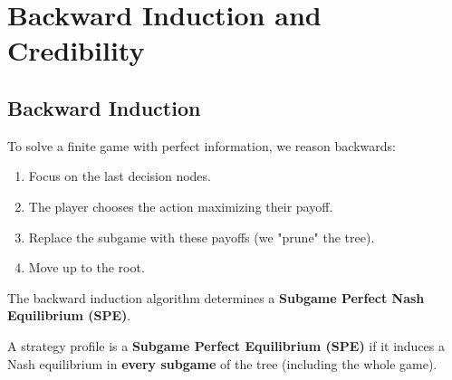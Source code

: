 \section{Backward Induction and Credibility}

\subsection{Backward Induction}
To solve a finite game with perfect information, we reason backwards:
\begin{enumerate}
    \item Focus on the last decision nodes.
    \item The player chooses the action maximizing their payoff.
    \item Replace the subgame with these payoffs (we "prune" the tree).
    \item Move up to the root.
\end{enumerate}

\begin{theoreme}
The backward induction algorithm determines a \textbf{Subgame Perfect Nash Equilibrium (SPE)}.
\end{theoreme}

\begin{definition}
A strategy profile is a \textbf{Subgame Perfect Equilibrium (SPE)} if it induces a Nash equilibrium in \textbf{every subgame} of the tree (including the whole game).
\end{definition}

